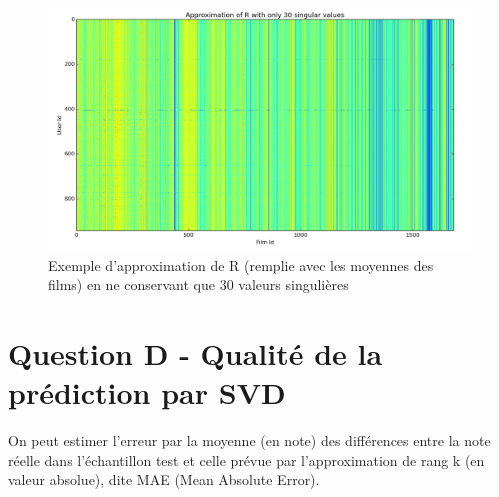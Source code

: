 \documentclass[12pt,a4paper]{article}
\begin{document}
\begin{figure}
\centering
\includegraphics[scale=0.2]{R-Approximation-By-Movie.png}
\caption{Exemple d'approximation de R (remplie avec les moyennes des films) en ne conservant que 30 valeurs singulières}
\end{figure}

\newpage
\section{Question D - Qualité de la prédiction par SVD}
On peut estimer l'erreur par la moyenne (en note) des différences entre la note réelle dans l'échantillon test et celle prévue par l'approximation de rang k (en valeur absolue), dite MAE (Mean Absolute Error).\\
\end{document}
